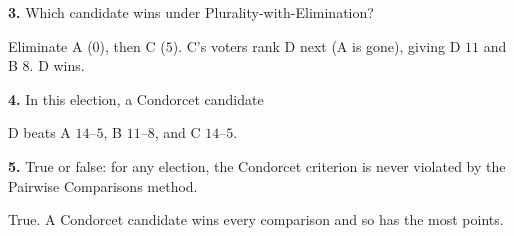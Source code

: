 \documentclass[12pt]{ximera}
\begin{document}
\begin{problem}
\begin{prompt}
\textbf{3.} Which candidate wins under Plurality-with-Elimination?

\begin{multipleChoice}
\end{multipleChoice}

\begin{feedback}
Eliminate A ($0$), then C ($5$). C's voters rank D next (A is gone), giving D $11$ and
B $8$. D wins.
\end{feedback}
\end{prompt}

\begin{prompt}
\textbf{4.} In this election, a Condorcet candidate

\begin{multipleChoice}
\end{multipleChoice}

\begin{feedback}
D beats A $14$--$5$, B $11$--$8$, and C $14$--$5$.
\end{feedback}
\end{prompt}
\end{problem}

\begin{problem}
\textbf{5.} True or false: for any election, the Condorcet criterion is never violated by
the Pairwise Comparisons method.

\begin{multipleChoice}
\end{multipleChoice}

\begin{feedback}
True. A Condorcet candidate wins every comparison and so has the most points.
\end{feedback}
\end{problem}
\end{document}
